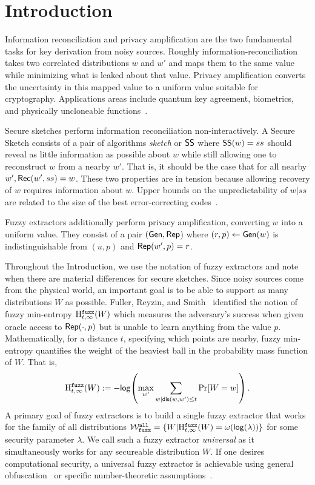 
\section{Introduction}
Information reconciliation and privacy amplification are the two fundamental tasks for key derivation from noisy sources.  Roughly information-reconciliation takes two correlated distributions $w$ and $w'$ and maps them to the same value while minimizing what is leaked about that value.  Privacy amplification converts the uncertainty in this mapped value to a uniform value suitable for cryptography.  Applications areas include quantum key agreement, biometrics, and physically uncloneable functions~\cite{bennett1988privacy,dodis2008fuzzy}. 

Secure sketches perform information reconciliation non-interactively.  A Secure Sketch consists of a pair of algorithms \emph{sketch} or ${\mathsf{SS}}$ where ${\mathsf{SS}}(w) = ss$ should reveal as little information as possible about $w$ while still allowing one to reconstruct $w$ from a nearby $w'$. That is, it should be the case that for all nearby $w', {\mathsf{Rec}}(w', ss) = w$.  These two properties are in tension because allowing recovery of $w$ requires information about $w$.  Upper bounds on the unpredictability of $w | ss$ are related to the size of the best error-correcting codes~\cite{dodis2008fuzzy,fuller2020computational}. 

  Fuzzy extractors additionally perform privacy amplification, converting $w$ into a uniform value.  They consist of a pair $({\mathsf{Gen}}, {\mathsf{Rep}}$) where $(r, p)\leftarrow {\ensuremath{\mathsf{Gen}}}(w)$ is indistinguishable from $(u, p)$ and ${\mathsf{Rep}}(w', p) =r$.

  Throughout the Introduction, we use the notation of fuzzy extractors
  and note when there are material differences for secure sketches.
  Since noisy sources come from the physical world, an important goal
  is to be able to support as many distributions $W$ as possible.
  Fuller, Reyzin, and Smith~\cite{fuller2016fuzzy,fuller2020fuzzy}
  identified the notion of fuzzy min-entropy $\mathrm{H}^{\mathtt{fuzz}}_{t,\infty}(W)$ which
  measures the adversary's success when given oracle access to
  ${\mathsf{Rep}}(\cdot, p)$ but is unable to learn anything from the value $p$.
  Mathematically, for a distance $t$, specifying which points are
  nearby, fuzzy min-entropy quantifies the weight of the heaviest ball
  in the probability mass function of $W$.  That is,
\[
\mathrm{H}^{\mathtt{fuzz}}_{t,\infty}(W):= -\mathsf{log}\!\left(\max_{w'} \sum_{w | \mathsf{dis}(w, w')\le t} \Pr[W=w]\right).
\]A primary goal of fuzzy extractors is to build a single fuzzy extractor that works for the family of all distributions $\mathcal{W}_{\mathtt{fuzz}}^{\mathtt{all}} = \{ W | \mathrm{H}^{\mathtt{fuzz}}_{t,\infty}(W) = \omega(\mathsf{log}\!\left(\lambda\right))\}$ for some security parameter $\lambda$.  We call such a fuzzy extractor \emph{universal} as it simultaneously works for any secureable distribution $W$. 
If one desires computational security, a universal fuzzy extractor is achievable using general obfuscation~\cite{BarakBCKPS13,BitanskyCKP14,bitansky2017virtual} or specific number-theoretic assumptions~\cite{galbraith2019obfuscated}. 


